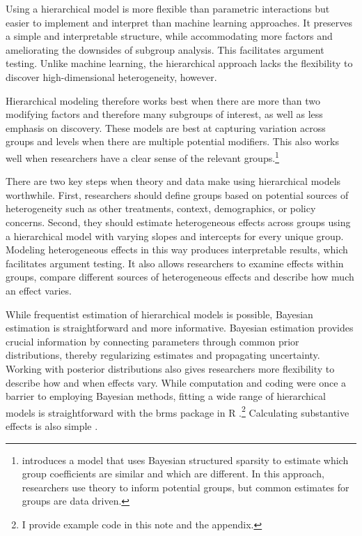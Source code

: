 \documentclass[12pt]{article}
\begin{document}
 
Using a hierarchical model is more flexible than parametric interactions but easier to implement and interpret than machine learning approaches.  
It preserves a simple and interpretable structure, while accommodating more factors and ameliorating the downsides of subgroup analysis. 
This facilitates argument testing.
Unlike machine learning, the hierarchical approach lacks the flexibility to discover high-dimensional heterogeneity, however.  


Hierarchical modeling therefore works best when there are more than two modifying factors and therefore many subgroups of interest, as well as less emphasis on discovery. 
These models are best at capturing variation across groups and levels when there are multiple potential modifiers.
This also works well when researchers have a clear sense of the relevant groups.\footnote{\citep{Goplerud2021} introduces a model that uses Bayesian structured sparsity to estimate which group coefficients are similar and which are different. In this approach, researchers use theory to inform potential groups, but common estimates for groups are data driven.} 


There are two key steps when theory and data make using hierarchical models worthwhile.
First, researchers should define groups based on potential sources of heterogeneity such as other treatments, context, demographics, or policy concerns. 
Second, they should estimate heterogeneous effects across groups using a hierarchical model with varying slopes and intercepts for every unique group. 
Modeling heterogeneous effects in this way produces interpretable results, which facilitates argument testing.
It also allows researchers to examine effects within groups, compare different sources of heterogeneous effects and describe how much an effect varies.  


While frequentist estimation of hierarchical models is possible, Bayesian estimation is straightforward and more informative.
Bayesian estimation provides crucial information by connecting parameters through common prior distributions, thereby regularizing estimates and propagating uncertainty. 
Working with posterior distributions also gives researchers more flexibility to describe how and when effects vary. 
While computation and coding were once a barrier to employing Bayesian methods, fitting a wide range of hierarchical models is straightforward with the brms package in \textsf{R} \citep{Buerkner2017}.\footnote{I provide example code in this note and the appendix.}
Calculating substantive effects is also simple \citep{ArelBundockme}.
\end{document}

